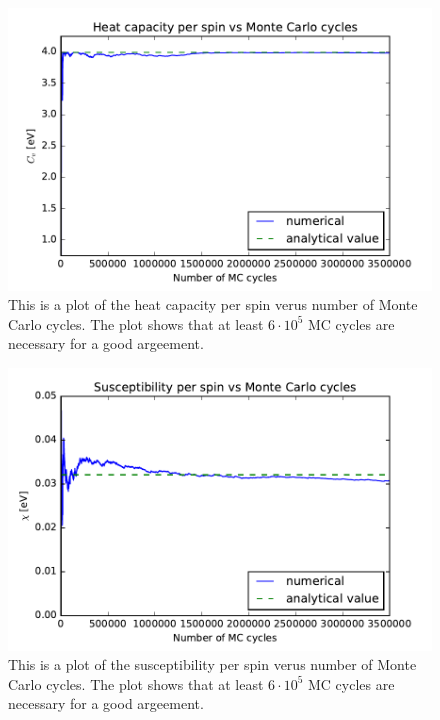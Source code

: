 \begin{figure}[H]
\includegraphics[width=\linewidth]{../results/4b/L_2_heat_capasity}\caption{This is a plot of the heat capacity per spin verus number of Monte Carlo cycles. The plot shows that at least $ 6 \cdot 10^{5} $ MC cycles are necessary for a good argeement.}\label{fig:L_2_heat_capacity}
\end{figure}

\begin{figure}[H]
\includegraphics[width=\linewidth]{../results/4b/L_2_susceptibility}\caption{This is a plot of the susceptibility per spin verus number of Monte Carlo cycles. The plot shows that at least $ 6 \cdot 10^{5} $ MC cycles are necessary for a good argeement.}\label{fig:L_2_susceptibility}
\end{figure}